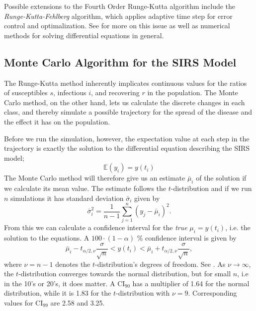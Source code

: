 \documentclass[]{article}
\begin{document}
Possible extensions to the Fourth Order Runge-Kutta algorithm include the \textit{Runge-Kutta-Fehlberg} algorithm, which applies adaptive time step for error control and optimalization. See \cite{fys4150-notes} for more on this issue as well as numerical methods for solving differential equations in general.

\subsection{Monte Carlo Algorithm for the SIRS Model} \label{sec:monte-carlo}
The Runge-Kutta method inherently implicates continuous values for the ratios of susceptibles $s$, infectious $i$, and recovering $r$ in the population. The Monte Carlo method, on the other hand, lets us calculate the discrete changes in each class, and thereby simulate a possible trajectory for the spread of the disease and the effect it has on the population. 

Before we run the simulation, however, the expectation value at each step in the trajectory is exactly the solution to the differential equation describing the SIRS model;
\begin{equation}
	\mathbb{E}(y_i) = y(t_i)
\end{equation}
The Monte Carlo method will therefore give us an estimate $\bar{\mu}_i$ of the solution if we calculate its mean value. The estimate follows the $t$-distribution and if we run $n$ simulations it has standard deviation $\bar{\sigma}_i$ given by
\begin{equation}
	\bar{\sigma}_i^2 = \frac{1}{n-1} \sum_{j=1}^{n} (y_j - \bar{\mu}_i)^2.
\end{equation}
From this we can calculate a confidence interval for the \textit{true} $\mu_i = y(t_i)$, i.e. the solution to the equations. A $100 \cdot (1-\alpha)$ \% confidence interval is given by
\begin{equation}
	\bar{\mu}_i - t_{\alpha/2, \nu} \frac{\sigma}{\sqrt{n}} < y(t_i) < \bar{\mu}_i + t_{\alpha/2, \nu} \frac{\sigma}{\sqrt{n}},
\end{equation}
where $\nu = n-1$ denotes the $t$-distribution's degrees of freedom. See \cite{devore2012}. As $\nu \rightarrow \infty$, the $t$-distribution converges towards the normal distribution, but for small $n$, i.e in the 10's or 20's, it does matter. A CI$_{90}$ has a multiplier of 1.64 for the normal distribution, while it is 1.83 for the $t$-distribution with $\nu=9$. Corresponding values for CI$_{99}$ are 2.58 and 3.25.
\end{document}

